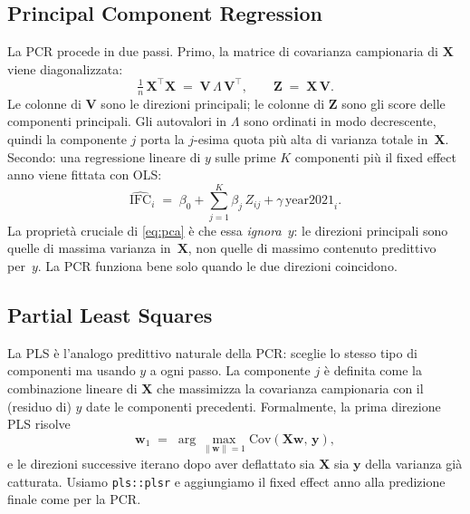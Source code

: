 \documentclass[11pt,a4paper]{article}
\begin{document}
\subsection{Principal Component Regression}

La PCR procede in due passi. Primo, la matrice di covarianza
campionaria di \(\mathbf{X}\) viene diagonalizzata:
\begin{equation}
  \tfrac{1}{n}\,\mathbf{X}^{\top}\mathbf{X}
  \;=\;
  \mathbf{V}\,\Lambda\,\mathbf{V}^{\top},
  \qquad
  \mathbf{Z} \;=\; \mathbf{X}\,\mathbf{V}.
  \label{eq:pca}
\end{equation}
Le colonne di \(\mathbf{V}\) sono le direzioni principali; le
colonne di \(\mathbf{Z}\) sono gli score delle componenti
principali. Gli autovalori in \(\Lambda\) sono ordinati in modo
decrescente, quindi la componente \(j\) porta la \(j\)-esima quota
più alta di varianza totale in~\(\mathbf{X}\). Secondo: una
regressione lineare di \(y\) sulle prime \(K\) componenti più il
fixed effect anno viene fittata con OLS:
\begin{equation}
  \widehat{\mathrm{IFC}}_i
  \;=\;
  \beta_{0}
  + \sum_{j=1}^{K} \beta_{j}\,Z_{ij}
  + \gamma\,\mathrm{year2021}_{i}.
  \label{eq:pcr}
\end{equation}
La proprietà cruciale di \eqref{eq:pca} è che essa
\emph{ignora}~\(y\): le direzioni principali sono quelle di
massima varianza in~\(\mathbf{X}\), non quelle di massimo
contenuto predittivo per~\(y\). La PCR funziona bene solo quando
le due direzioni coincidono.

\subsection{Partial Least Squares}

La PLS è l'analogo predittivo naturale della PCR: sceglie lo
stesso tipo di componenti ma usando \(y\) a ogni passo. La
componente \(j\) è definita come la combinazione lineare di
\(\mathbf{X}\) che massimizza la covarianza campionaria con il
(residuo di) \(y\) date le componenti precedenti. Formalmente, la
prima direzione PLS risolve
\begin{equation}
  \mathbf{w}_{1}
  \;=\;
  \arg\max_{\|\mathbf{w}\| = 1}
    \mathrm{Cov}\!\left(\mathbf{X}\mathbf{w},\,\mathbf{y}\right),
  \label{eq:pls1}
\end{equation}
e le direzioni successive iterano dopo aver deflattato sia
\(\mathbf{X}\) sia \(\mathbf{y}\) della varianza già catturata.
Usiamo \texttt{pls::plsr} e aggiungiamo il fixed effect anno alla
predizione finale come per la PCR.
\end{document}
